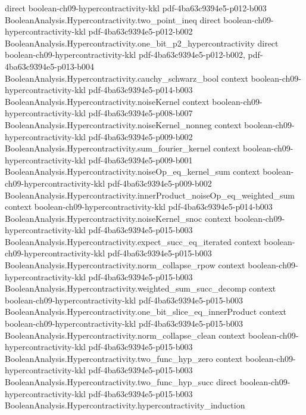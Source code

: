 \begin{theorem}
  {direct}
  {boolean-ch09-hypercontractivity-kkl}
  {pdf-4ba63c9394e5-p012-b003}
\proofstep
  {BooleanAnalysis.Hypercontractivity.two_point_ineq}
  {direct}
  {boolean-ch09-hypercontractivity-kkl}
  {pdf-4ba63c9394e5-p012-b002}
\proofstep
  {BooleanAnalysis.Hypercontractivity.one_bit_p2_hypercontractivity}
  {direct}
  {boolean-ch09-hypercontractivity-kkl}
  {pdf-4ba63c9394e5-p012-b002,
    pdf-4ba63c9394e5-p013-b004}
\proofstep
  {BooleanAnalysis.Hypercontractivity.cauchy_schwarz_bool}
  {context}
  {boolean-ch09-hypercontractivity-kkl}
  {pdf-4ba63c9394e5-p014-b003}
\proofstep
  {BooleanAnalysis.Hypercontractivity.noiseKernel}
  {context}
  {boolean-ch09-hypercontractivity-kkl}
  {pdf-4ba63c9394e5-p008-b007}
\proofstep
  {BooleanAnalysis.Hypercontractivity.noiseKernel_nonneg}
  {context}
  {boolean-ch09-hypercontractivity-kkl}
  {pdf-4ba63c9394e5-p009-b002}
\proofstep
  {BooleanAnalysis.Hypercontractivity.sum_fourier_kernel}
  {context}
  {boolean-ch09-hypercontractivity-kkl}
  {pdf-4ba63c9394e5-p009-b001}
\proofstep
  {BooleanAnalysis.Hypercontractivity.noiseOp_eq_kernel_sum}
  {context}
  {boolean-ch09-hypercontractivity-kkl}
  {pdf-4ba63c9394e5-p009-b002}
\proofstep
  {BooleanAnalysis.Hypercontractivity.innerProduct_noiseOp_eq_weighted_sum}
  {context}
  {boolean-ch09-hypercontractivity-kkl}
  {pdf-4ba63c9394e5-p014-b003}
\proofstep
  {BooleanAnalysis.Hypercontractivity.noiseKernel_snoc}
  {context}
  {boolean-ch09-hypercontractivity-kkl}
  {pdf-4ba63c9394e5-p015-b003}
\proofstep
  {BooleanAnalysis.Hypercontractivity.expect_succ_eq_iterated}
  {context}
  {boolean-ch09-hypercontractivity-kkl}
  {pdf-4ba63c9394e5-p015-b003}
\proofstep
  {BooleanAnalysis.Hypercontractivity.norm_collapse_rpow}
  {context}
  {boolean-ch09-hypercontractivity-kkl}
  {pdf-4ba63c9394e5-p015-b003}
\proofstep
  {BooleanAnalysis.Hypercontractivity.weighted_sum_succ_decomp}
  {context}
  {boolean-ch09-hypercontractivity-kkl}
  {pdf-4ba63c9394e5-p015-b003}
\proofstep
  {BooleanAnalysis.Hypercontractivity.one_bit_slice_eq_innerProduct}
  {context}
  {boolean-ch09-hypercontractivity-kkl}
  {pdf-4ba63c9394e5-p015-b003}
\proofstep
  {BooleanAnalysis.Hypercontractivity.norm_collapse_clean}
  {context}
  {boolean-ch09-hypercontractivity-kkl}
  {pdf-4ba63c9394e5-p015-b003}
\proofstep
  {BooleanAnalysis.Hypercontractivity.two_func_hyp_zero}
  {context}
  {boolean-ch09-hypercontractivity-kkl}
  {pdf-4ba63c9394e5-p015-b003}
\proofstep
  {BooleanAnalysis.Hypercontractivity.two_func_hyp_succ}
  {direct}
  {boolean-ch09-hypercontractivity-kkl}
  {pdf-4ba63c9394e5-p015-b003}
\proofstep
  {BooleanAnalysis.Hypercontractivity.hypercontractivity_induction}

\end{theorem}

